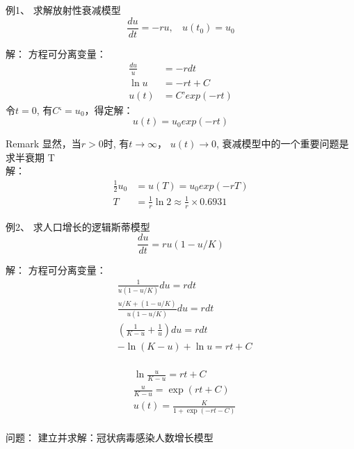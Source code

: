 \begin{frame}
	\begin{exampleblock} {例1、	求解放射性衰减模型}
	\begin{equation*}
	\frac{du}{dt}	= - ru, ~~~~ u(t_0) = u_0
	\end{equation*}
	\end{exampleblock} 	
	\alert{解：} 方程可分离变量：
	\begin{align*}
		\frac{du}{u} &= - rdt\\
		\ln u &=-rt+C\\
		u(t)&=C’exp(-rt)	
	\end{align*}
	令$t=0$, 有$C‘=u_0$，得定解：
	\begin{equation*}
		u(t)=u_0 exp(-rt)
	\end{equation*}
\end{frame}


\begin{frame}
\begin{block} {Remark}
	显然，当$r>0$时, 有$t \to \infty$， $u(t) \to 0$,  衰减模型中的一个重要问题是求半衰期 T\\
	\alert{解：} 
	\begin{align*}
	\frac{1}{2}u_0 &=u(T) =u_0 exp(-rT)\\
	T &=\frac{1}{r} \ln 2  \approx \frac{1}{r} \times 0.6931	
	\end{align*}
	\end{block}
\end{frame}

\begin{frame}
	\begin{exampleblock} {例2、	求人口增长的逻辑斯蒂模型}
	\begin{equation*}
		\frac{d u}{d t}=r u (1-u/K)
	\end{equation*}
	\end{exampleblock} 	
	\alert{解：} 方程可分离变量：
	\begin{align*}
		&\frac{1}{u(1-u / K)}du =r d t \\
		&\frac{u / K+(1-u / K)}{u(1-u / K)} d u =r d t	\\
		&(\frac{1}{K-u}+\frac{1}{u} ) d u =r d t \\
		&-\ln (K-u)+\ln u =r t+C \\
	\end{align*}	
\end{frame}

\begin{frame}
	\begin{align*}
		&\ln \frac{u}{K-u}  =r t+C\\
		&\frac{u}{K-u} =\exp (r t+C)\\
		&u(t)  =\frac{K}{1+\exp (-r t-C)}	\\
	\end{align*}	
	\begin{block} {问题：}
	建立并求解：冠状病毒感染人数增长模型
	\end{block}    
\end{frame}

